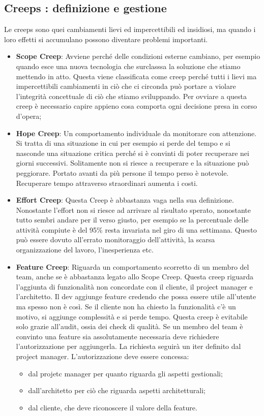 \subsection{Creeps : definizione e gestione}
Le creeps sono quei cambiamenti lievi ed impercettibili ed insidiosi, ma quando i loro effetti si accumulano possono diventare problemi importanti.
\begin{itemize}
	\item \textbf{Scope Creep}: Avviene perché delle condizioni esterne cambiano, per esempio quando esce una nuova tecnologia che surclasssa la soluzione che stiamo mettendo in atto. Questa viene classificata come creep perché tutti i lievi ma impercettibili cambiamenti in ciò che ci circonda può portare a violare l'integrità concettuale di ciò che stiamo sviluppando. Per ovviare a questa creep è necessario capire appieno cosa comporta ogni decisione presa in corso d'opera;
	\item \textbf{Hope Creep}: Un comportamento individuale da monitorare con attenzione. Si tratta di una situazione in cui per esempio si perde del tempo e si nasconde una situazione critica perché si è convinti di poter recuperare nei giorni successivi. Solitamente non si riesce a recuperare e la situazione può peggiorare. Portato avanti da più persone il tempo perso è notevole. Recuperare tempo attraverso straordinari aumenta i costi.
	\item \textbf{Effort Creep}: Questa Creep è abbastanza vaga nella sua definizione. Nonostante l'effort non si riesce ad arrivare al risultato sperato, nonostante tutto sembri andare per il verso giusto, per esempio se la percentuale delle attività compiute è del 95\% resta invariata nel giro di una settimana. Questo può essere dovuto all'errato monitoraggio dell'attività, la scarsa organizzazione del lavoro, l'inesperienza etc.
	\item \textbf{Feature Creep}: Riguarda un comportamento scorretto di un membro del team, anche se è abbastanza legato allo Scope Creep. Questa creep riguarda l'aggiunta di funzionalità non concordate con il cliente, il project manager e l'architetto. Il dev aggiunge feature credendo che possa essere utile all'utente ma spesso non è così. Se il cliente non ha chiesto la funzionalità c'è un motivo, si aggiunge complessità e si perde tempo. Questa creep è evitabile solo grazie all'audit, ossia dei check di qualità.\newline
	Se un membro del team è convinto una feature sia assolutamente necessaria deve richiedere l'autorizzazione per aggiungerla. La richiesta seguirà un iter definito dal project manager. L'autorizzazione deve essere concessa:
	\begin{itemize}
		\item dal projetc manager per quanto riguarda gli aspetti gestionali;
		\item dall'architetto per ciò che riguarda aspetti architetturali;
		\item dal cliente, che deve riconoscere il valore della feature.
	\end{itemize}
\end{itemize}
